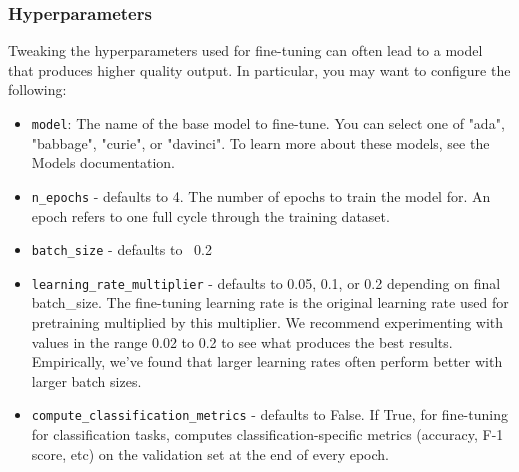 \begin{frame}[fragile]\frametitle{Hyperparameters}

Tweaking the hyperparameters used for fine-tuning can often lead to a model that produces higher quality output. In particular, you may want to configure the following:

\begin{itemize}
\item \lstinline|model|: The name of the base model to fine-tune. You can select one of "ada", "babbage", "curie", or "davinci". To learn more about these models, see the Models documentation.
\item \lstinline|n_epochs| - defaults to 4. The number of epochs to train the model for. An epoch refers to one full cycle through the training dataset.
\item \lstinline|batch_size| - defaults to ~0.2%
\item \lstinline|learning_rate_multiplier| - defaults to 0.05, 0.1, or 0.2 depending on final batch\_size. The fine-tuning learning rate is the original learning rate used for pretraining multiplied by this multiplier. We recommend experimenting with values in the range 0.02 to 0.2 to see what produces the best results. Empirically, we've found that larger learning rates often perform better with larger batch sizes.
\item \lstinline|compute_classification_metrics| - defaults to False. If True, for fine-tuning for classification tasks, computes classification-specific metrics (accuracy, F-1 score, etc) on the validation set at the end of every epoch.
\end{itemize}


\end{frame}






